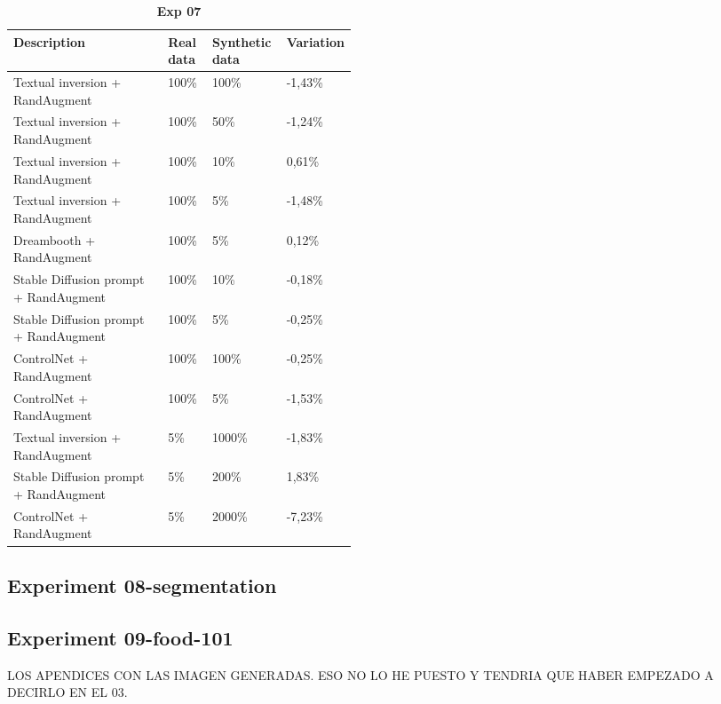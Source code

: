 \begin{table}[ht]
\centering
\begin{tabular}{|p{0.45\linewidth}|l|l|l|}
\hline
\cellcolor[HTML]{BFBFBF}\textbf{Description} & \cellcolor[HTML]{BFBFBF}\textbf{Real   data} & \cellcolor[HTML]{BFBFBF}\textbf{Synthetic   data} & \cellcolor[HTML]{BFBFBF}\textbf{Variation} \\ \hline
Textual inversion + RandAugment & 100\% & 100\% & -1,43\% \\ \hline
Textual inversion + RandAugment & 100\% & 50\% & -1,24\% \\ \hline
Textual inversion + RandAugment & 100\% & 10\% & 0,61\% \\ \hline
Textual inversion + RandAugment & 100\% & 5\% & -1,48\% \\ \hline
Dreambooth + RandAugment & 100\% & 5\% & 0,12\% \\ \hline
Stable Diffusion prompt + RandAugment & 100\% & 10\% & -0,18\% \\ \hline
Stable Diffusion prompt + RandAugment & 100\% & 5\% & -0,25\% \\ \hline
ControlNet + RandAugment & 100\% & 100\% & -0,25\% \\ \hline
ControlNet + RandAugment & 100\% & 5\% & -1,53\% \\ \hline
Textual inversion + RandAugment & 5\% & 1000\% & -1,83\% \\ \hline
Stable Diffusion prompt + RandAugment & 5\% & 200\% & 1,83\% \\ \hline
ControlNet + RandAugment & 5\% & 2000\% & -7,23\% \\ \hline
\end{tabular}
\caption{\textbf{Exp 07}}
\label{table:TableExp07}
\end{table}

\subsection{Experiment 08-segmentation} \label{sec: exp-08}

\subsection{Experiment 09-food-101} \label{sec: exp-09}



LOS APENDICES CON LAS IMAGEN GENERADAS. ESO NO LO HE PUESTO Y TENDRIA QUE HABER EMPEZADO A DECIRLO EN EL 03.